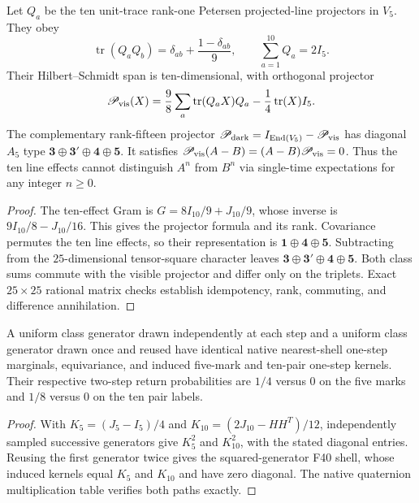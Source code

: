 \documentclass[11pt]{article}
\begin{document}
\begin{corollary}
\label{p1b:cor:pairline-blind15}
Let $Q_a$ be the ten unit-trace rank-one Petersen projected-line
projectors in $V_5$. They obey
\[
 \operatorname{tr}(Q_aQ_b)=\delta_{ab}+\frac{1-\delta_{ab}}9,
 \qquad\sum_{a=1}^{10}Q_a=2I_5.
\]
Their Hilbert--Schmidt span is ten-dimensional, with orthogonal projector
\[
 \mathscr P_{\rm vis}(X)=\frac98\sum_a\operatorname{tr}(Q_aX)Q_a
 -\frac14\operatorname{tr}(X)I_5.
\]
The complementary rank-fifteen projector
$\mathscr P_{\rm dark}=I_{\operatorname{End}(V_5)}-\mathscr P_{\rm vis}$
has diagonal $A_5$ type $\mathbf3\oplus\mathbf3'\oplus\mathbf4\oplus\mathbf5$.
It satisfies
$\mathscr P_{\rm vis}(A-B)=(A-B)\mathscr P_{\rm vis}=0$.
Thus the ten line effects cannot distinguish $A^n$ from $B^n$ via
single-time expectations for any integer $n\ge0$.
\end{corollary}
\begin{proof}
The ten-effect Gram is $G=8I_{10}/9+J_{10}/9$,
whose inverse is $9I_{10}/8-J_{10}/16$. This gives the projector
formula and its rank. Covariance permutes the ten line effects,
so their representation is $\mathbf1\oplus\mathbf4\oplus\mathbf5$.
Subtracting from the $25$-dimensional tensor-square character leaves
$\mathbf3\oplus\mathbf3'\oplus\mathbf4\oplus\mathbf5$.
Both class sums commute with the visible projector and differ only
on the triplets. Exact $25\times25$ rational matrix checks establish
idempotency, rank, commuting, and difference annihilation.
\end{proof}

\begin{proposition}
\label{p1b:prop:twostep-memory-no-go}
A uniform class generator drawn independently at each step and a
uniform class generator drawn once and reused have identical native
nearest-shell one-step marginals, equivariance, and induced five-mark
and ten-pair one-step kernels. Their respective two-step return
probabilities are $1/4$ versus $0$ on the five marks and $1/8$ versus
$0$ on the ten pair labels.
\end{proposition}
\begin{proof}
With $K_5=(J_5-I_5)/4$ and $K_{10}=(2J_{10}-HH^T)/12$,
independently sampled successive generators give $K_5^2$ and
$K_{10}^2$, with the stated diagonal entries. Reusing the first
generator twice gives the squared-generator F40 shell, whose induced
kernels equal $K_5$ and $K_{10}$ and have zero diagonal. The
native quaternion multiplication table verifies both paths exactly.
\end{proof}
\end{document}
